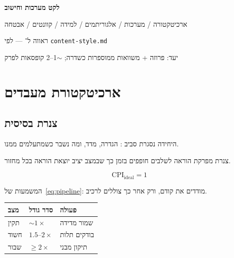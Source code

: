 
\usepackage{graphicx}


\begin{titlepage}
\centering\vspace*{3.8cm}
{\Huge\bfseries לקט מערכות וחישוב\par}
\vspace{1.0cm}
{\Large ארכיטקטורה / מערכות / אלגוריתמים / למידה / קוונטים / אבטחה\par}
\vspace{0.8cm}
{\large ראווה ל־ — לפי \texttt{content-style.md}\par}
\vspace{0.4cm}
{\large יעד: פרוזה + משוואות ממוספרות כשדרה; $\sim$1--2 קופסאות לפרק\par}
\vfill
\end{titlepage}

\tableofcontents
\clearpage

\part{ארכיטקטורת מעבדים}

\chapter{צנרת בסיסית}
\label{ch:pipeline}

היחידה נסגרת סביב : הגדרה, מדד, ומה נשבר כשמתעלמים ממנו.

\begin{defbox}[frametitle={הגדרה — צנרת בסיסית}]
צנרת מפרקת הוראה לשלבים חופפים בזמן כך שבמצב יציב יוצאת הוראה בכל מחזור.
\end{defbox}

\begin{equation}
\label{eq:pipeline}
\mathrm{CPI}_{\mathrm{ideal}}=1
\end{equation}

המשמעות של~\eqref{eq:pipeline}: מודדים את  קודם, ורק אחר כך צוללים לרכיב.

\begin{tablebox}\centering\small
\begin{tabular}{@{}lll@{}}
\toprule
\textbf{מצב} & \textbf{סדר גודל} & \textbf{פעולה}\\
\midrule
תקין & $\sim 1\times$ & שמור מדידה\\
חשוד & $1.5$–$2\times$ & בודקים תלות\\
שבור & $\ge 2\times$ & תיקון מבני\\
\bottomrule
\end{tabular}
\end{tablebox}

